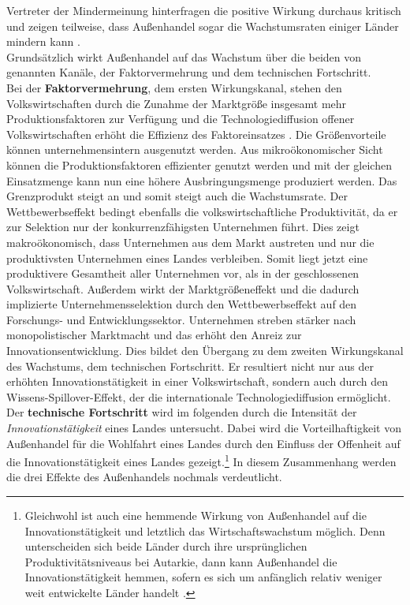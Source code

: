 Vertreter der Mindermeinung  hinterfragen die positive Wirkung durchaus kritisch und zeigen teilweise, dass Außenhandel sogar die Wachstumsraten einiger Länder mindern kann \cite{RodriguezCaballero.2000,Matsuyama.,Young.1991,Galor.2008}.\bigskip\\
Grundsätzlich wirkt Außenhandel auf das Wachstum über die beiden von \cite{Gandolfo.1998} genannten Kanäle, der Faktorvermehrung und dem technischen Fortschritt.\\
Bei der \textbf{Faktorvermehrung}, dem ersten Wirkungskanal, stehen den Volkswirtschaften durch die Zunahme der Marktgröße insgesamt mehr Produktionsfaktoren zur Verfügung und die Technologiediffusion offener Volkswirtschaften erhöht die Effizienz des Faktoreinsatzes \cite{Gandolfo.1998}. Die Größenvorteile können unternehmensintern ausgenutzt werden. Aus mikroökonomischer Sicht können die Produktionsfaktoren effizienter genutzt werden und mit der gleichen Einsatzmenge kann nun eine höhere Ausbringungsmenge produziert werden. Das Grenzprodukt steigt an und somit steigt auch die Wachstumsrate. Der Wettbewerbseffekt bedingt ebenfalls die volkswirtschaftliche Produktivität, da er zur Selektion nur der konkurrenzfähigsten Unternehmen führt. Dies zeigt makroökonomisch, dass Unternehmen aus dem Markt austreten und nur die produktivsten Unternehmen eines Landes verbleiben. Somit liegt jetzt eine produktivere Gesamtheit aller Unternehmen vor, als in der geschlossenen Volkswirtschaft. Außerdem wirkt der Marktgrößeneffekt und die dadurch implizierte Unternehmensselektion durch den Wettbewerbseffekt auf den Forschungs- und Entwicklungssektor. Unternehmen streben stärker nach monopolistischer Marktmacht und das erhöht den Anreiz zur Innovationsentwicklung.  Dies bildet den Übergang zu dem zweiten Wirkungskanal des Wachstums, dem technischen Fortschritt. Er resultiert nicht nur aus der erhöhten Innovationstätigkeit in einer Volkswirtschaft, sondern auch durch den Wissens-Spillover-Effekt, der die internationale Technologiediffusion ermöglicht.\\
%
Der \textbf{technische Fortschritt} wird im folgenden durch die Intensität der \textit{Innovationstätigkeit} eines Landes untersucht. Dabei wird die Vorteilhaftigkeit von Außenhandel für die Wohlfahrt eines Landes durch den Einfluss der Offenheit auf die Innovationstätigkeit eines Landes gezeigt.\footnote{Gleichwohl ist auch eine hemmende Wirkung von Außenhandel auf die Innovationstätigkeit und letztlich das Wirtschaftswachstum möglich. Denn unterscheiden sich beide Länder durch ihre ursprünglichen Produktivitätsniveaus bei Autarkie, dann kann Außenhandel die Innovationstätigkeit hemmen, sofern es sich um anfänglich relativ weniger weit entwickelte Länder handelt \cite{Devereux.1994,RiveraBatiz.1991a}.} In diesem Zusammenhang werden die drei Effekte des Außenhandels nochmals verdeutlicht. \\
